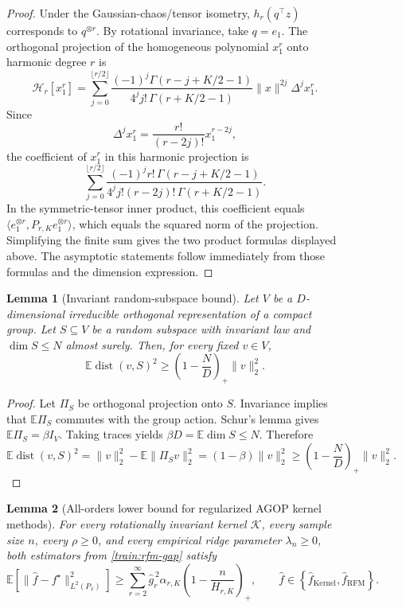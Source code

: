 \documentclass{article}
\newtheorem{lemma}[lemma]{Lemma}
\begin{document}
\begin{figure}
\begin{proof}
Under the Gaussian-chaos/tensor isometry,
$h_r(q^\top z)$ corresponds to $q^{\otimes r}$. By rotational
invariance, take $q=e_1$. The orthogonal projection of the homogeneous
polynomial $x_1^r$ onto harmonic degree $r$ is
\[
    \mathcal H_r[x_1^r]
    =\sum_{j=0}^{\lfloor r/2\rfloor}
      \frac{(-1)^j\Gamma(r-j+K/2-1)}
           {4^j j!\,\Gamma(r+K/2-1)}
      \|x\|^{2j}\Delta^j x_1^r.
\]
Since
\[
    \Delta^j x_1^r=\frac{r!}{(r-2j)!}x_1^{r-2j},
\]
the coefficient of $x_1^r$ in this harmonic projection is
\[
    \sum_{j=0}^{\lfloor r/2\rfloor}
      \frac{(-1)^j r!\,\Gamma(r-j+K/2-1)}
           {4^j j!(r-2j)!\,\Gamma(r+K/2-1)}.
\]
In the symmetric-tensor inner product, this coefficient equals
$\langle e_1^{\otimes r},P_{r,K}e_1^{\otimes r}\rangle$, which equals the
squared norm of the projection. Simplifying the finite sum gives the two
product formulas displayed above. The asymptotic statements follow
immediately from those formulas and the dimension expression.
\end{proof}

\begin{lemma}[Invariant random-subspace bound]
\label{lem:random-subspace-bound}
Let $V$ be a $D$-dimensional irreducible orthogonal representation of a compact
group. Let $S\subseteq V$ be a random subspace with invariant law and
$\dim S\leq N$ almost surely. Then, for every fixed $v\in V$,
\[
    \mathbb E\operatorname{dist}(v,S)^2
    \geq\left(1-\frac ND\right)_+\|v\|_2^2.
\]
\end{lemma}

\begin{proof}
Let $\Pi_S$ be orthogonal projection onto $S$. Invariance implies that
$\mathbb E\Pi_S$ commutes with the group action. Schur's lemma gives
$\mathbb E\Pi_S=\beta I_V$. Taking traces yields
$\beta D=\mathbb E\dim S\leq N$. Therefore
\[
    \mathbb E\operatorname{dist}(v,S)^2
    =\|v\|_2^2-\mathbb E\|\Pi_Sv\|_2^2
    =(1-\beta)\|v\|_2^2
    \geq\left(1-\frac ND\right)_+\|v\|_2^2.
\]
\end{proof}

\begin{lemma}[All-orders lower bound for regularized AGOP kernel methods]
\label{lem:all-orders-krr-lower-bound}
For every rotationally invariant kernel $\mathcal K$, every sample size $n$,
every $\rho\geq0$, and every empirical ridge parameter $\lambda_n\geq0$,
both estimators from \cref{train:rfm-gap} satisfy
\[
    \mathbb E\left[
        \|\widehat f-f^\star\|_{L^2(P_x)}^2
    \right]
    \geq
    \sum_{r=2}^\infty
    \widehat g_r^{\,2}\alpha_{r,K}
    \left(1-\frac{n}{H_{r,K}}\right)_+,
    \qquad
    \widehat f\in
    \left\{\widehat f_{\mathrm{Kernel}},\widehat f_{\mathrm{RFM}}\right\}.
\]
\end{lemma}


\end{figure}
\end{document}
